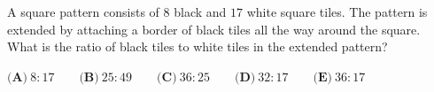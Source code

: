 A square pattern consists of $8$ black and $17$ white square tiles. The pattern is extended by attaching a border of black tiles all the way around the square. What is the ratio of black tiles to white tiles in the extended pattern?

$\textbf{(A)}\ 8:17\qquad\textbf{(B)}\ 25:49\qquad\textbf{(C)}\ 36:25\qquad\textbf{(D)}\ 32:17\qquad\textbf{(E)}\ 36:17$
